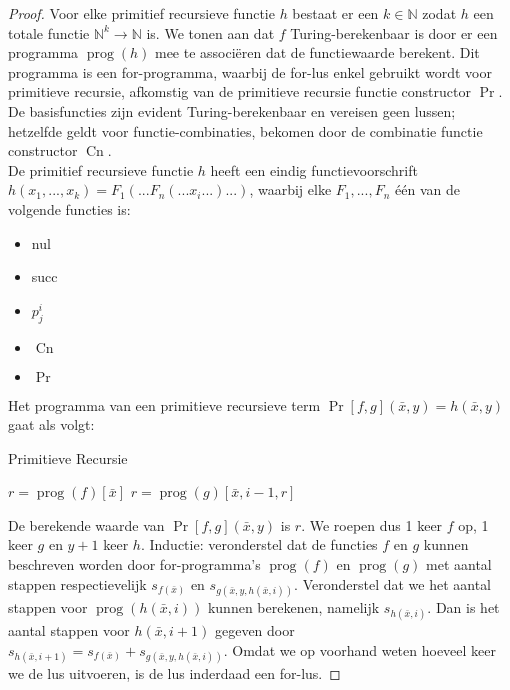 \documentclass[kulak]{kulakarticle}
\newcommand{\N}{\mathbb{N}}
\DeclareMathOperator{\prog}{prog}
\DeclareMathOperator{\pr}{Pr}
\DeclareMathOperator{\cn}{Cn}
\theoremstyle{definition}
\begin{document}
	\begin{proof}
		Voor elke primitief recursieve functie \( h \) bestaat er een \(k\in\N\) zodat \(h\) een totale functie \( \N^k\to\N \) is. We tonen aan dat \(f\) Turing-berekenbaar is door er een programma \(\prog(h)\) mee te associëren dat de functiewaarde berekent. Dit programma is een for-programma, waarbij de for-lus enkel gebruikt wordt voor primitieve recursie, afkomstig van de primitieve recursie functie constructor \(\pr\). De basisfuncties zijn evident Turing-berekenbaar en vereisen geen lussen; hetzelfde geldt voor functie-combinaties, bekomen door de combinatie functie constructor \( \cn \).
		\hfill\\

		De primitief recursieve functie \( h \) heeft een eindig functievoorschrift \(h(x_1,...,x_k) = F_1(...F_n(...x_i...)...)\), waarbij elke \(F_1,...,F_n\) één van de volgende functies is:
		\begin{itemize}
			\item nul
			\item succ
			\item \(p^i_j\)
			\item \( \cn \)
			\item \( \pr \)
		\end{itemize}

		Het programma van een primitieve recursieve term \( \pr[f,g](\bar{x},y)=h(\bar{x},y) \) gaat als volgt:

		\begin{algorithm}
			\caption{Primitieve Recursie}
			\begin{algorithmic}[1]
						\State $r=\prog(f)[\bar{x}]$
					\Else
						\State $r=\prog(g)[\bar{x}, i-1, r]$
					\EndIf
				\EndFor
			\end{algorithmic}
		\end{algorithm}

		De berekende waarde van \(\pr[f,g](\bar{x},y)\) is \(r\). We roepen dus 1 keer \(f\) op, 1 keer \(g\) en \(y+1\) keer \(h\). Inductie: veronderstel dat de functies \(f\) en \(g\) kunnen beschreven worden door for-programma's \(\prog(f)\) en \(\prog(g)\) met aantal stappen respectievelijk \(s_{f(\bar{x})}\) en \(s_{g(\bar{x},y,h(\bar{x},i))}\). Veronderstel dat we het aantal stappen voor \(\prog(h(\bar{x},i))\) kunnen berekenen, namelijk \(s_{h(\bar{x},i)}\). Dan is het aantal stappen voor \(h(\bar{x},i+1)\) gegeven door \(s_{h(\bar{x},i+1)}=s_{f(\bar{x})}+s_{g(\bar{x},y,h(\bar{x},i))}\). Omdat we op voorhand  weten hoeveel keer we de lus uitvoeren, is de lus inderdaad een for-lus.
	\end{proof}
\end{document}
